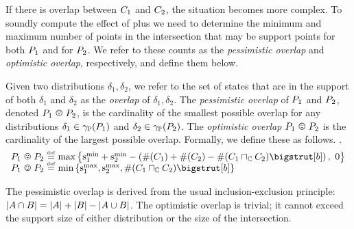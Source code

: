 If there is overlap between $ C_{1} $ and $ C_{2} $, the
situation becomes more complex. To soundly compute the effect of plus
we need to determine the minimum and maximum number of points in the
intersection that may be support points for both $P_{1}$ and for
$P_{2}$.  We refer to these counts as the \emph{pessimistic overlap}
and \emph{optimistic overlap}, respectively, and define them below.

\begin{definition}
\label{def:abs-overlap}
  Given two distributions $\delta_1,\delta_2$, we refer to the set of
  states that are in the support of both $\delta_1$ and $\delta_2$ as
  the \emph{overlap} of $\delta_1,\delta_2$.  The \emph{pessimistic
    overlap} of $P_{1}$ and $P_{2}$, denoted $\pessoverlap{\ppa}{\ppb}$,
  is the cardinality of the smallest possible overlap for any distributions
  $\delta_1 \in \gamma_{\mathbb{P}}(P_{1})$ and $\delta_2 \in \gamma_{\mathbb{P}}(P_{2})$.  The
  \emph{optimistic overlap} $\optoverlap{\ppa}{\ppb}$ is the cardinality of the largest possible
  overlap.  Formally, we define these as follows. .%
\[\begin{array}{l}
\pessoverlap{\ppa}{\ppb} \defeq \maxparen{ \smin{1} +
\smin{2} - \paren{\psize{\pa} + \psize{\pb} - \psize{\pa
    \pmeet \pb} \bigstrut[b] } ,\ 0} \\
\optoverlap{\ppa}{\ppb} \defeq \minparen{\smax{1}, \smax{2}, \psize{\pa
    \pmeet \pb} \bigstrut[b]} \\
\end{array}\]

\end{definition}

The pessimistic overlap is derived from the usual inclusion-exclusion
principle: $ \left| A \cap B \right| = \left| A \right| + \left| B \right| -
\left| A \cup B \right| $.
The optimistic overlap is trivial; it cannot exceed the support size of either
distribution or the size of the intersection.

